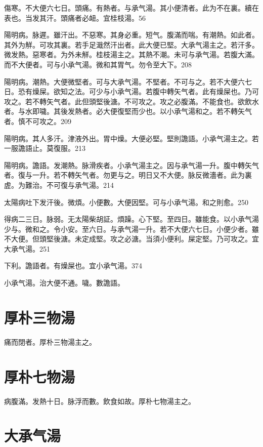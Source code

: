 \documentclass[12pt,twoside,UTF8,b5paper]{ctexbook}
\begin{document}
傷寒。不大便六七日。頭痛。有熱者。与承气湯。其小便清者。此为不在裏。續在表也。当发其汗。頭痛者必衄。宜桂枝湯。56

陽明病。脉遲。雖汗出。不惡寒。其身必重。短气。腹滿而喘。有潮熱。如此者。其外为觧。可攻其裏。若手足濈然汗出者。此大便已堅。{大}承气湯主之。若汗多。微发熱。惡寒者。为外未觧。{桂枝湯主之。}其熱不潮。未可与承气湯。若腹大滿。而不大便者。可与小承气湯。微和其胃气。勿令至大下。208

陽明病。潮熱。大便微堅者。可与{大}承气湯。不堅者。不可与之。若不大便六七日。恐有燥屎。欲知之法。可少与小承气湯。若腹中轉矢气者。此有燥屎也。乃可攻之。若不轉矢气者。此但頭堅後溏。不可攻之。攻之必腹滿。不能食也。欲飲水者。与水即噦。其後发熱者。必大便復堅而少也。以小承气湯和之。若不轉矢气者。慎不可攻之。209

陽明病。其人多汗。津液外出。胃中燥。大便必堅。堅則譫語。{小}承气湯主之。{若一服譫語止。莫復服。}213

陽明病。譫語。发潮熱。脉滑疾者。{小}承气湯主之。因与承气湯一升。腹中轉矢气者。復与一升。若不轉矢气者。勿更与之。明日又不大便。脉反微濇者。此为裏虗。为難治。不可復与承气湯。214

太陽病吐下发汗後。微煩。小便數。大便因堅。可与小承气湯。和之則愈。250

得病二三日。脉弱。无太陽柴胡証。煩躁。心下堅。至四日。雖能食。以{小}承气湯少与。微和之。令小安。至六日。与承气湯一升。若不大便六七日。小便少者。雖不大便。但頭堅後溏。未定成堅。攻之必溏。当須小便利。屎定堅。乃可攻之。宜{大}承气湯。251

下利。譫語者。有燥屎也。宜{小}承气湯。374

小承气湯。治大便不通。噦。數譫語。

\section{厚朴三物湯}

痛而閉者。厚朴三物湯主之。

\section{厚朴七物湯}

病腹滿。发熱十日。脉浮而數。飲食如故。厚朴七物湯主之。

\section{大承气湯}
\end{document}
